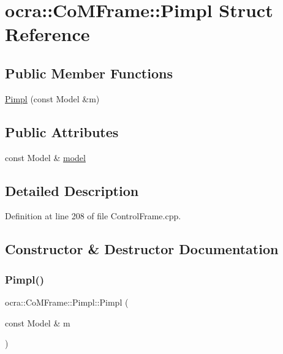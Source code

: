 \hypertarget{structocra_1_1CoMFrame_1_1Pimpl}{}\section{ocra\+:\+:Co\+M\+Frame\+:\+:Pimpl Struct Reference}
\label{structocra_1_1CoMFrame_1_1Pimpl}
\subsection*{Public Member Functions}
\begin{DoxyCompactItemize}
\item 
\hyperlink{structocra_1_1CoMFrame_1_1Pimpl_a2b4badc79278777e9f5a570e7b583905}{Pimpl} (const Model \&m)
\end{DoxyCompactItemize}
\subsection*{Public Attributes}
\begin{DoxyCompactItemize}
\item 
const Model \& \hyperlink{structocra_1_1CoMFrame_1_1Pimpl_aa6727f07a45efaed605571d416ff4727}{model}
\end{DoxyCompactItemize}


\subsection{Detailed Description}


Definition at line 208 of file Control\+Frame.\+cpp.



\subsection{Constructor \& Destructor Documentation}
\hypertarget{structocra_1_1CoMFrame_1_1Pimpl_a2b4badc79278777e9f5a570e7b583905}{}\label{structocra_1_1CoMFrame_1_1Pimpl_a2b4badc79278777e9f5a570e7b583905} 
\subsubsection{\texorpdfstring{Pimpl()}{Pimpl()}}
{\footnotesize\ttfamily ocra\+::\+Co\+M\+Frame\+::\+Pimpl\+::\+Pimpl (\begin{DoxyParamCaption}\item[{const Model \&}]{m }\end{DoxyParamCaption})\hspace{0.3cm}{\ttfamily [inline]}}



